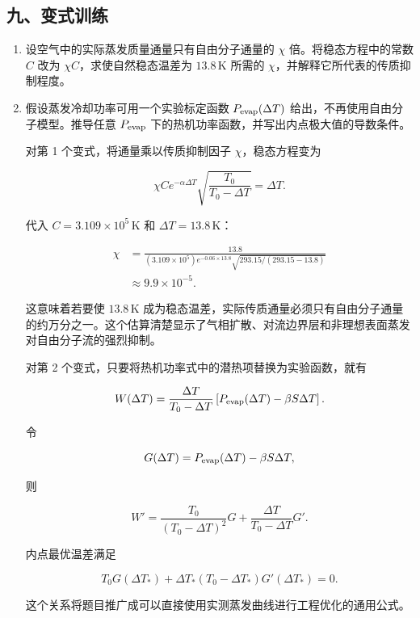 \documentclass[12pt,a4paper,UTF8]{ctexart}
\begin{document}
\subsection{九、变式训练}\label{ux4e5dux53d8ux5f0fux8badux7ec3-6}

\begin{enumerate}
\def\labelenumi{\arabic{enumi}.}
\item
  设空气中的实际蒸发质量通量只有自由分子通量的 \(\chi\)
  倍。将稳态方程中的常数 \(C\) 改为 \(\chi C\)，求使自然稳态温差为
  \(13.8\,\mathrm K\) 所需的 \(\chi\)，并解释它所代表的传质抑制程度。
\item
  假设蒸发冷却功率可用一个实验标定函数 \(P_{\rm evap}(\Delta T)\)
  给出，不再使用自由分子模型。推导任意 \(P_{\rm evap}\)
  下的热机功率函数，并写出内点极大值的导数条件。

  对第 1 个变式，将通量乘以传质抑制因子 \(\chi\)，稳态方程变为

  \[
  \chi C e^{-\alpha\Delta T}
  \sqrt{\frac{T_0}{T_0-\Delta T}}=\Delta T.
  \]

  代入 \(C=3.109\times10^5\,\mathrm K\) 和
  \(\Delta T=13.8\,\mathrm K\)：

  \[
  \begin{aligned}
  \chi
  &=\frac{13.8}
  {(3.109\times10^5)e^{-0.06\times13.8}
  \sqrt{293.15/(293.15-13.8)}}\\
  &\approx9.9\times10^{-5}.
  \end{aligned}
  \]

  这意味着若要使 \(13.8\,\mathrm K\)
  成为稳态温差，实际传质通量必须只有自由分子通量的约万分之一。这个估算清楚显示了气相扩散、对流边界层和非理想表面蒸发对自由分子流的强烈抑制。

  对第 2 个变式，只要将热机功率式中的潜热项替换为实验函数，就有

  \[
  W(\Delta T)
  =\frac{\Delta T}{T_0-\Delta T}
  \left[P_{\rm evap}(\Delta T)-\beta S\Delta T\right].
  \]

  令

  \[
  G(\Delta T)=P_{\rm evap}(\Delta T)-\beta S\Delta T,
  \]

  则

  \[
  W'
  =\frac{T_0}{(T_0-\Delta T)^2}G
  +\frac{\Delta T}{T_0-\Delta T}G'.
  \]

  内点最优温差满足

  \[
  \boxed{
  T_0G(\Delta T_*)
  +\Delta T_*(T_0-\Delta T_*)G'(\Delta T_*)=0
  }.
  \]

  这个关系将题目推广成可以直接使用实测蒸发曲线进行工程优化的通用公式。
\end{enumerate}
\end{document}
